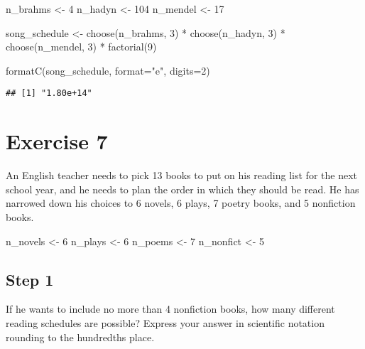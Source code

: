 \documentclass[
]{article}
\newenvironment{Shaded}{\begin{snugshade}}{\end{snugshade}}
\newcommand{\AttributeTok}[1]{\textcolor[rgb]{0.77,0.63,0.00}{#1}}
\newcommand{\DecValTok}[1]{\textcolor[rgb]{0.00,0.00,0.81}{#1}}
\newcommand{\FunctionTok}[1]{\textcolor[rgb]{0.00,0.00,0.00}{#1}}
\newcommand{\NormalTok}[1]{#1}
\newcommand{\OtherTok}[1]{\textcolor[rgb]{0.56,0.35,0.01}{#1}}
\newcommand{\SpecialCharTok}[1]{\textcolor[rgb]{0.00,0.00,0.00}{#1}}
\newcommand{\StringTok}[1]{\textcolor[rgb]{0.31,0.60,0.02}{#1}}
\begin{document}
\begin{Shaded}
\begin{Highlighting}[]
\NormalTok{n\_brahms }\OtherTok{\textless{}{-}} \DecValTok{4}
\NormalTok{n\_hadyn }\OtherTok{\textless{}{-}} \DecValTok{104}
\NormalTok{n\_mendel }\OtherTok{\textless{}{-}} \DecValTok{17}

\NormalTok{song\_schedule }\OtherTok{\textless{}{-}} \FunctionTok{choose}\NormalTok{(n\_brahms, }\DecValTok{3}\NormalTok{) }\SpecialCharTok{*} 
  \FunctionTok{choose}\NormalTok{(n\_hadyn, }\DecValTok{3}\NormalTok{) }\SpecialCharTok{*} 
  \FunctionTok{choose}\NormalTok{(n\_mendel, }\DecValTok{3}\NormalTok{) }\SpecialCharTok{*} 
  \FunctionTok{factorial}\NormalTok{(}\DecValTok{9}\NormalTok{)}

\FunctionTok{formatC}\NormalTok{(song\_schedule, }\AttributeTok{format=}\StringTok{"e"}\NormalTok{, }\AttributeTok{digits=}\DecValTok{2}\NormalTok{)}
\end{Highlighting}
\end{Shaded}

\begin{verbatim}
## [1] "1.80e+14"
\end{verbatim}

\hypertarget{exercise-7}{%
\section{Exercise 7}\label{exercise-7}}

An English teacher needs to pick 13 books to put on his reading list for
the next school year, and he needs to plan the order in which they
should be read. He has narrowed down his choices to 6 novels, 6 plays, 7
poetry books, and 5 nonfiction books.

\begin{Shaded}
\begin{Highlighting}[]
\NormalTok{n\_novels }\OtherTok{\textless{}{-}} \DecValTok{6}
\NormalTok{n\_plays }\OtherTok{\textless{}{-}} \DecValTok{6}
\NormalTok{n\_poems }\OtherTok{\textless{}{-}} \DecValTok{7}
\NormalTok{n\_nonfict }\OtherTok{\textless{}{-}} \DecValTok{5}
\end{Highlighting}
\end{Shaded}

\hypertarget{step-1-1}{%
\subsection{Step 1}\label{step-1-1}}

If he wants to include no more than 4 nonfiction books, how many
different reading schedules are possible? Express your answer in
scientific notation rounding to the hundredths place.
\end{document}
